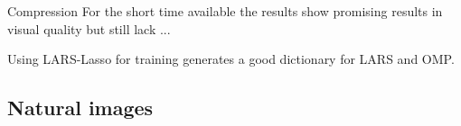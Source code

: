 Compression
For the short time available the results show promising results in visual
quality but still lack ...

Using LARS-Lasso for training generates a good dictionary for LARS and OMP.


\subsection{Natural images}

\begin{figure}[h]
\centering
{}
\hspace{5mm}
\hspace{5mm}
\hspace{5mm}
\hspace{5mm}

\end{figure}
